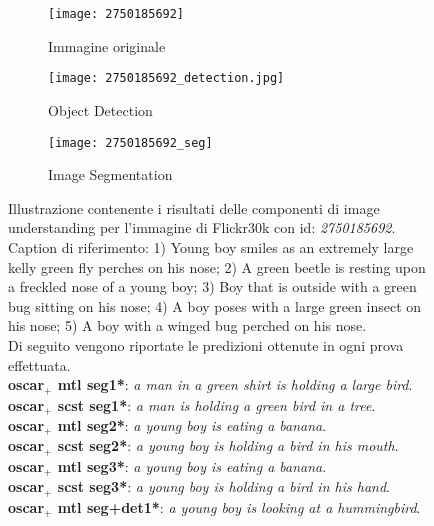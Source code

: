 \begin{figure}[H]
     \centering
     \begin{subfigure}[b]{0.45\textwidth}
         \centering
         \texttt{[image: 2750185692]}
         \caption{Immagine originale}
     \end{subfigure}
     \begin{subfigure}[b]{0.45\textwidth}
         \centering
         \texttt{[image: 2750185692\_detection.jpg]}
         \caption{Object Detection}
     \end{subfigure}
     \begin{subfigure}[b]{0.45\textwidth}
         \centering
         \texttt{[image: 2750185692\_seg]}
         \caption{Image Segmentation}
     \end{subfigure}
     \captionsetup{singlelinecheck=off}
        \caption{Illustrazione contenente i risultati delle componenti di image understanding per l'immagine di Flickr30k con id: \textit{2750185692}.
        Caption di riferimento: 1) Young boy smiles as an extremely large kelly green fly perches on his nose; 2) A green beetle is resting upon a freckled nose of a young boy; 3) Boy that is outside with a green bug sitting on his nose; 4) A boy poses with a large green insect on his nose; 5) A boy with a winged bug perched on his nose.\\
        Di seguito vengono riportate le predizioni ottenute in ogni prova effettuata.\\
        \textbf{\acrshort{oscar}$_+$ \acrshort{mtl} seg1*}: \textit{a man in a green shirt is holding a large bird}.\\
        \textbf{\acrshort{oscar}$_+$ \acrshort{scst} seg1*}: \textit{a man is holding a green bird in a tree}.\\
        \textbf{\acrshort{oscar}$_+$ \acrshort{mtl} seg2*}: \textit{a young boy is eating a banana}.\\
        \textbf{\acrshort{oscar}$_+$ \acrshort{scst} seg2*}: \textit{a young boy is holding a bird in his mouth}.\\
        \textbf{\acrshort{oscar}$_+$ \acrshort{mtl} seg3*}: \textit{a young boy is eating a banana}.\\
        \textbf{\acrshort{oscar}$_+$ \acrshort{scst} seg3*}: \textit{a young boy is holding a bird in his hand}.\\
        \textbf{\acrshort{oscar}$_+$ \acrshort{mtl} seg+det1*}: \textit{a young boy is looking at a hummingbird}.\\
}
\end{figure}
